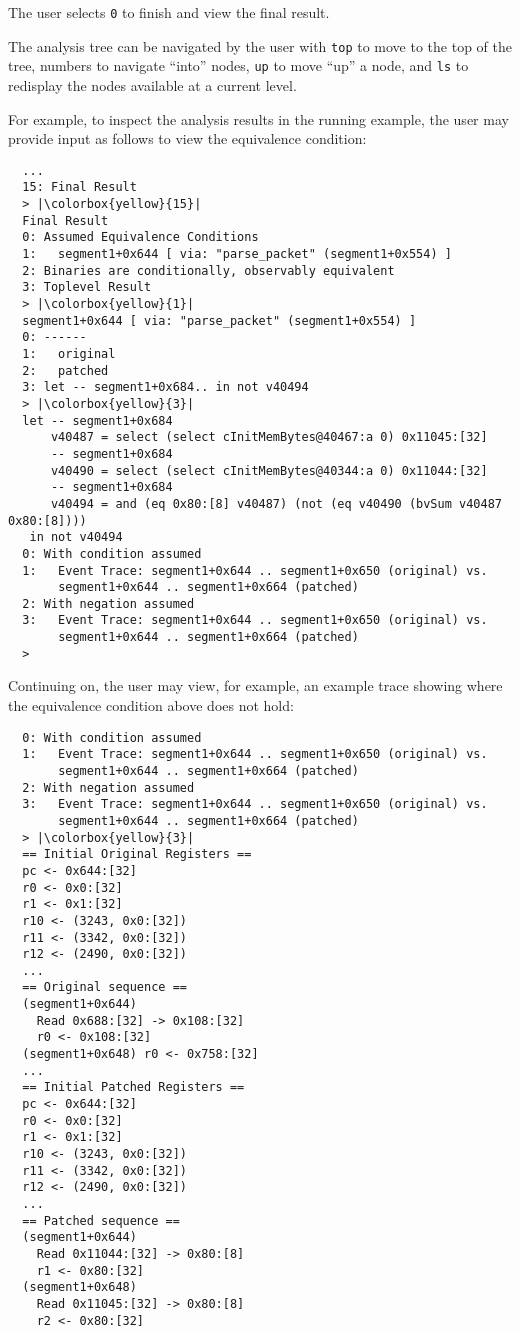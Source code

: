 The user selects \texttt{0} to finish and view the final result.

The \pate{} analysis tree can be navigated by the user with \texttt{top} to move to the top of the tree, numbers to navigate ``into'' nodes, \texttt{up} to move ``up'' a node, and \texttt{ls} to redisplay the nodes available at a current level.

For example, to inspect the analysis results in the running example, the user may provide input as follows to view the equivalence condition:

\begin{lstlisting}
  ...
  15: Final Result
  > |\colorbox{yellow}{15}|
  Final Result
  0: Assumed Equivalence Conditions
  1:   segment1+0x644 [ via: "parse_packet" (segment1+0x554) ]
  2: Binaries are conditionally, observably equivalent
  3: Toplevel Result
  > |\colorbox{yellow}{1}|
  segment1+0x644 [ via: "parse_packet" (segment1+0x554) ]
  0: ------
  1:   original
  2:   patched
  3: let -- segment1+0x684.. in not v40494
  > |\colorbox{yellow}{3}|
  let -- segment1+0x684
      v40487 = select (select cInitMemBytes@40467:a 0) 0x11045:[32]
      -- segment1+0x684
      v40490 = select (select cInitMemBytes@40344:a 0) 0x11044:[32]
      -- segment1+0x684
      v40494 = and (eq 0x80:[8] v40487) (not (eq v40490 (bvSum v40487 0x80:[8])))
   in not v40494
  0: With condition assumed
  1:   Event Trace: segment1+0x644 .. segment1+0x650 (original) vs.
       segment1+0x644 .. segment1+0x664 (patched)
  2: With negation assumed
  3:   Event Trace: segment1+0x644 .. segment1+0x650 (original) vs.
       segment1+0x644 .. segment1+0x664 (patched)
  >
\end{lstlisting}

Continuing on, the user may view, for example, an example trace showing where the equivalence condition above does not hold:

\begin{lstlisting}
  0: With condition assumed
  1:   Event Trace: segment1+0x644 .. segment1+0x650 (original) vs.
       segment1+0x644 .. segment1+0x664 (patched)
  2: With negation assumed
  3:   Event Trace: segment1+0x644 .. segment1+0x650 (original) vs.
       segment1+0x644 .. segment1+0x664 (patched)
  > |\colorbox{yellow}{3}|
  == Initial Original Registers ==
  pc <- 0x644:[32]
  r0 <- 0x0:[32]
  r1 <- 0x1:[32]
  r10 <- (3243, 0x0:[32])
  r11 <- (3342, 0x0:[32])
  r12 <- (2490, 0x0:[32])
  ...
  == Original sequence ==
  (segment1+0x644)
    Read 0x688:[32] -> 0x108:[32]
    r0 <- 0x108:[32]
  (segment1+0x648) r0 <- 0x758:[32]
  ...
  == Initial Patched Registers ==
  pc <- 0x644:[32]
  r0 <- 0x0:[32]
  r1 <- 0x1:[32]
  r10 <- (3243, 0x0:[32])
  r11 <- (3342, 0x0:[32])
  r12 <- (2490, 0x0:[32])
  ...
  == Patched sequence ==
  (segment1+0x644)
    Read 0x11044:[32] -> 0x80:[8]
    r1 <- 0x80:[32]
  (segment1+0x648)
    Read 0x11045:[32] -> 0x80:[8]
    r2 <- 0x80:[32]
\end{lstlisting}

